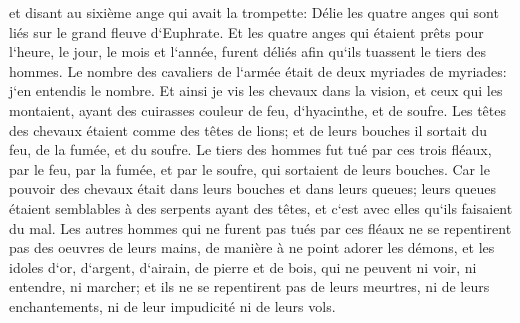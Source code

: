 \verse et disant au sixième ange qui avait la trompette: Délie les quatre anges qui sont liés sur le grand fleuve d`Euphrate. 
\verse Et les quatre anges qui étaient prêts pour l`heure, le jour, le mois et l`année, furent déliés afin qu`ils tuassent le tiers des hommes. 
\verse Le nombre des cavaliers de l`armée était de deux myriades de myriades: j`en entendis le nombre. 
\verse Et ainsi je vis les chevaux dans la vision, et ceux qui les montaient, ayant des cuirasses couleur de feu, d`hyacinthe, et de soufre. Les têtes des chevaux étaient comme des têtes de lions; et de leurs bouches il sortait du feu, de la fumée, et du soufre. 
\verse Le tiers des hommes fut tué par ces trois fléaux, par le feu, par la fumée, et par le soufre, qui sortaient de leurs bouches. 
\verse Car le pouvoir des chevaux était dans leurs bouches et dans leurs queues; leurs queues étaient semblables à des serpents ayant des têtes, et c`est avec elles qu`ils faisaient du mal. 
\verse Les autres hommes qui ne furent pas tués par ces fléaux ne se repentirent pas des oeuvres de leurs mains, de manière à ne point adorer les démons, et les idoles d`or, d`argent, d`airain, de pierre et de bois, qui ne peuvent ni voir, ni entendre, ni marcher; 
\verse et ils ne se repentirent pas de leurs meurtres, ni de leurs enchantements, ni de leur impudicité ni de leurs vols. 

